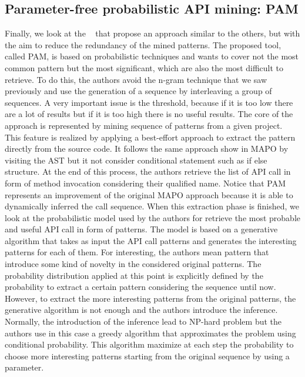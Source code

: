 \subsection{Parameter-free probabilistic API mining: PAM}
Finally, we look at the ~\cite{fowkes_parameter-free_2016} that propose an approach similar to the others, but with the aim to reduce the redundancy of the mined patterns. The proposed tool, called PAM, is based on probabilistic techniques and wants to cover not the most common pattern but the most significant, which are also the most difficult to retrieve. To do this, the authors avoid the n-gram technique that we saw previously and use the generation of a sequence by interleaving a group of sequences. A very important issue is the threshold, because if it is too low there are a lot of results but if it is too high there is no useful results. The core of the approach is represented by mining sequence of patterns from a given project. \\
This feature is realized by applying a best-effort approach to extract the pattern directly from the source code. It follows the same approach show in MAPO by visiting the AST but it not consider conditional statement such as if else structure. At the end of this process, the authors retrieve the list of API call in form of method invocation considering their qualified name. Notice that PAM represents an improvement of the original MAPO approach because it is able to dynamically inferred the call sequence. When this extraction phase is finished, we look at the probabilistic model used by the authors for retrieve the most probable and useful API call in form of patterns. The model is based on a generative algorithm that takes as input the API call patterns and generates the interesting patterns for each of them. For interesting, the authors mean pattern that introduce some kind of novelty in the considered original patterns. The probability distribution applied at this point is explicitly defined by the probability to extract a certain pattern considering the sequence until now. However, to extract the more interesting patterns from the original patterns, the generative algorithm is not enough and the authors introduce the inference. Normally, the introduction of the inference lead to NP-hard problem but the authors use in this case a greedy algorithm that approximates the problem using conditional probability. This algorithm maximize at each step the probability to choose more interesting patterns starting from the original sequence by using a parameter. \newline
